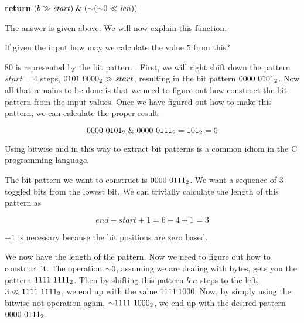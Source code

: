 \begin{Answer}[ref={getbits}]

  \begin{algorithmic}[1]
    \State \textbf{return} $(b \gg \mathit{start}) \mathrel{\&} (\mathord{\sim}
    (\mathord{\sim} 0 \ll \mathit{len}))$
    \EndProcedure
  \end{algorithmic}

  The answer is given above. We will now explain this function.

  If given the input  how may we calculate
  the value $5$ from this?

  $80$ is represented by the bit pattern . First, we
  will right shift down the pattern $start=4$ steps, $\mbox{\ensuremath{0101\ 0000_2}}
  \gg start$, resulting in the bit pattern $\mbox{\ensuremath{0000\
    0101_2}}$. Now all that remains to be done is that we need to figure
  out how construct the bit pattern \bin{0000\ 0111} from the input
  values. Once we have figured out how to make this pattern, we can
  calculate the proper result:

  \begin{equation*}
   \bin{0000\ 0101} \BitAnd \bin{0000\ 0111} = \bin{101} = 5
  \end{equation*}

  Using bitwise and in this way to extract bit patterns is a common
  idiom in the C programming language.

  The bit pattern we want to construct is $\mbox{\ensuremath{0000\ 0111_2}}$. We want
  a sequence of $3$ toggled bits from the lowest bit. We can trivially
  calculate the length of this pattern as

  \begin{equation*}
    end - start + 1 = 6 - 4 + 1 = 3
  \end{equation*}

  $ + 1$ is necessary because the bit positions are zero based.

  We now have the length of the pattern. Now we need to figure out how
  to construct it. The operation $\mathord{\sim} 0$, assuming we are dealing
  with bytes, gets you the pattern $\mbox{\ensuremath{1111\ 1111_2}}$. Then by
  shifting this pattern $len$ steps to the left, $3 \ll
  \mbox{\ensuremath{1111\ 1111_2}}$, we end up with the value $1111\ 1000$. Now, by
  simply using the bitwise not operation again, $\mathord{\sim} \mbox{\ensuremath{1111\
    1000_2}}$, we end up with the desired pattern $\mbox{\ensuremath{0000\ 0111_2}}$.

\end{Answer}

